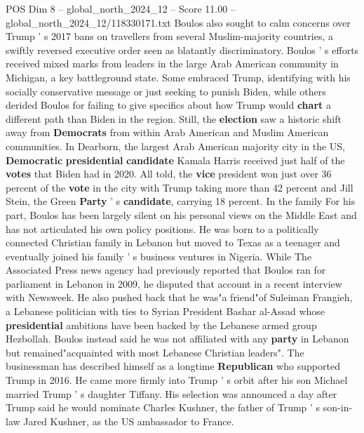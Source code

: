 \begin{textsample}{POS Dim 8 – global\_north\_2024\_12 – Score 11.00 – global\_north\_2024\_12/118330171.txt}
Boulos also sought to calm concerns over Trump ' s 2017 bans on travellers from several Muslim-majority countries, a swiftly reversed executive order seen as blatantly discriminatory.
Boulos ' s efforts received mixed marks from leaders in the large Arab American community in Michigan, a key battleground state.
Some embraced Trump, identifying with his socially conservative message or just seeking to punish Biden, while others derided Boulos for failing to give specifics about how Trump would \textbf{chart} a different path than Biden in the region.
Still, the \textbf{election} saw a historic shift away from \textbf{Democrats} from within Arab American and Muslim American communities.
In Dearborn, the largest Arab American majority city in the US, \textbf{Democratic} \textbf{presidential} \textbf{candidate} Kamala Harris received just half of the \textbf{votes} that Biden had in 2020.
All told, the \textbf{vice} president won just over 36 percent of the \textbf{vote} in the city with Trump taking more than 42 percent and Jill Stein, the Green \textbf{Party} ' s \textbf{candidate}, carrying 18 percent.
In the family For his part, Boulos has been largely silent on his personal views on the Middle East and has not articulated his own policy positions.
He was born to a politically connected Christian family in Lebanon but moved to Texas as a teenager and eventually joined his family ' s business ventures in Nigeria.
While The Associated Press news agency had previously reported that Boulos ran for parliament in Lebanon in 2009, he disputed that account in a recent interview with Newsweek.
He also pushed back that he was"a friend"of Suleiman Frangieh, a Lebanese politician with ties to Syrian President Bashar al-Assad whose \textbf{presidential} ambitions have been backed by the Lebanese armed group Hezbollah.
Boulos instead said he was not affiliated with any \textbf{party} in Lebanon but remained"acquainted with most Lebanese Christian leaders".
The businessman has described himself as a longtime \textbf{Republican} who supported Trump in 2016.
He came more firmly into Trump ' s orbit after his son Michael married Trump ' s daughter Tiffany.
His selection was announced a day after Trump said he would nominate Charles Kushner, the father of Trump ' s son-in-law Jared Kushner, as the US ambassador to France.

\end{textsample}
